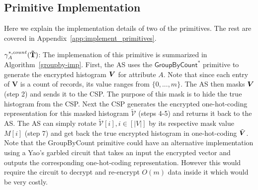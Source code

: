  

\subsection{Primitive Implementation}
Here we explain the implementation details of two of the  \system primitives. The rest are covered in Appendix~\ref{app:implement_primitives}.

 $\gamma^{*,count}_A(\mathbf{\tilde{T}})$: The implemenation of this primitive is summarized in Algorithm~\ref{groupby-imp}. First, the \textsf{AS} uses the $\textsf{GroupByCount}^*$ primitive to generate the encrypted histogram $\boldsymbol{V}$ for attribute $A$. Note that since each entry of $\mathbf{V}$ is a count of records, its value ranges from $\{0,...,m\}$. The \textsf{AS} then masks $\boldsymbol{V}$ (step 2) and sends it to the \textsf{CSP}. The purpose of this mask is to hide the true histogram from the \textsf{CSP}. Next the \textsf{CSP} generates the encrypted one-hot-coding representation for this masked histogram $\boldsymbol{\tilde{\mathcal{V}}}$ (steps 4-5) and returns it back to the \textsf{AS}. %
The \textsf{AS} can simply rotate $\boldsymbol{\tilde{\mathcal{V}}}[i], i \in [|V|]$ by its respective mask value $M[i]$ (step 7) and get back the true encrypted histogram in one-hot-coding $\tilde{\boldsymbol{V}}$.
Note that the \textsf{GroupByCount} primitive could have an alternative implementation using a Yao's garbled circuit that takes an input the encrypted vector and outputs the corresponding one-hot-coding representation. However this would require the circuit to decrypt and re-encrypt $O(m)$ data inside it which would be very costly. 
 


